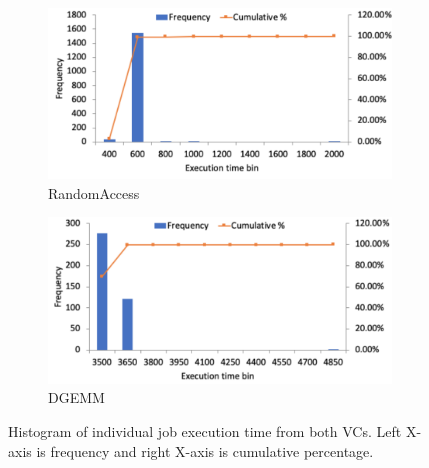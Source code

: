 \begin{figure}
     \centering
     \begin{subfigure}[b]{0.4\textwidth}
         \centering
         \includegraphics[width=\textwidth]{Figures/ra_histogram.pdf}
         \caption{RandomAccess}
         \label{fig:ra_histogram}
     \end{subfigure}
     \hfill
     \begin{subfigure}[b]{0.4\textwidth}
         \centering
         \includegraphics[width=\textwidth]{Figures/dgemm_histogram.pdf}
         \caption{DGEMM}
         \label{fig:dgemm_histogram}
     \end{subfigure}
     \caption{Histogram of individual job execution time from both VCs. Left X-axis is frequency and right X-axis is cumulative percentage.}
     \label{fig:histogram}
\end{figure}




